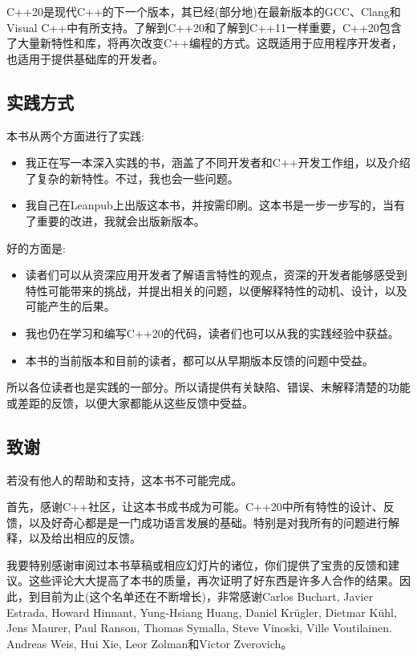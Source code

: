 
C++20是现代C++的下一个版本，其已经(部分地)在最新版本的GCC、Clang和Visual C++中有所支持。了解到C++20和了解到C++11一样重要，C++20包含了大量新特性和库，将再次改变C++编程的方式。这既适用于应用程序开发者，也适用于提供基础库的开发者。

\subsection*{实践方式}

本书从两个方面进行了实践:

\begin{itemize}
\item
我正在写一本深入实践的书，涵盖了不同开发者和C++开发工作组，以及介绍了复杂的新特性。不过，我也会一些问题。

\item
我自己在Leanpub上出版这本书，并按需印刷。这本书是一步一步写的，当有了重要的改进，我就会出版新版本。
\end{itemize}

好的方面是:

\begin{itemize}
\item
读者们可以从资深应用开发者了解语言特性的观点，资深的开发者能够感受到特性可能带来的挑战，并提出相关的问题，以便解释特性的动机、设计，以及可能产生的后果。

\item
我也仍在学习和编写C++20的代码，读者们也可以从我的实践经验中获益。

\item
本书的当前版本和目前的读者，都可以从早期版本反馈的问题中受益。
\end{itemize}

所以各位读者也是实践的一部分。所以请提供有关缺陷、错误、未解释清楚的功能或差距的反馈，以便大家都能从这些反馈中受益。

\subsection*{致谢}

若没有他人的帮助和支持，这本书不可能完成。

首先，感谢C++社区，让这本书成书成为可能。C++20中所有特性的设计、反馈，以及好奇心都是是一门成功语言发展的基础。特别是对我所有的问题进行解释，以及给出相应的反馈。

我要特别感谢审阅过本书草稿或相应幻灯片的诸位，你们提供了宝贵的反馈和建议。这些评论大大提高了本书的质量，再次证明了好东西是许多人合作的结果。因此，到目前为止(这个名单还在不断增长)，非常感谢Carlos Buchart, Javier Estrada, Howard Hinnant, Yung-Hsiang Huang, Daniel Kr{\"u}gler, Dietmar K{\"u}hl, Jens Maurer, Paul Ranson, Thomas Symalla, Steve Vinoski, Ville Voutilainen. Andreas Weis, Hui Xie, Leor Zolman和Victor Zverovich。

